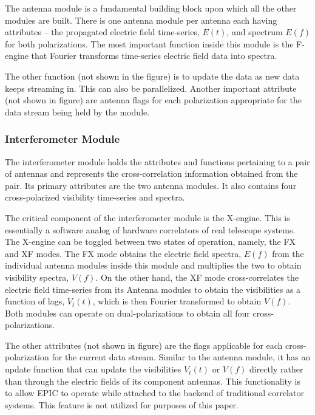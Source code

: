 \documentclass[a4paper,fleqn,usenatbib]{mnras}
\begin{document}
The antenna module is a fundamental building block upon which all the other 
modules are built. There is one antenna module per antenna each having 
attributes -- the propagated electric field time-series, $E(t)$, and spectrum 
$E(f)$ for both polarizations. The most important function inside this module 
is the F-engine that Fourier transforms time-series electric field data into 
spectra. 

The other function (not shown in the figure) is to update the data as new data 
keeps streaming in. This can also be parallelized. Another important attribute
(not shown in figure) are antenna flags for each polarization appropriate for 
the data stream being held by the module. 

\subsubsection{Interferometer Module}

The interferometer module holds the attributes and functions pertaining to
a pair of antennas and represents the cross-correlation information obtained
from the pair. Its primary attributes are the two antenna modules. It also
contains four cross-polarized visibility time-series and spectra. 

The critical component of the interferometer module is the X-engine. This is 
essentially a software analog of hardware correlators of real telescope 
systems. The X-engine can be toggled between two states of operation, 
namely, the FX and XF modes. The FX mode obtains the electric field spectra, 
$E(f)$ from the individual antenna modules inside this module and multiplies 
the two to obtain visibility spectra, $V(f)$. On the other hand, the XF mode 
cross-correlates the electric field time-series from its Antenna modules
to obtain the visibilities as a function of lags, $V_t(t)$, which is then Fourier 
transformed to obtain $V(f)$. Both modules can operate on dual-polarizations to
obtain all four cross-polarizations.

The other attributes (not shown in figure) are the flags applicable for each
cross-polarization for the current data stream. Similar to the antenna module,
it has an update function that can update the visibilities $V_t(t)$ or $V(f)$
directly rather than through the electric fields of its component antennas. 
This functionality is to allow EPIC to operate while attached to the backend 
of traditional correlator systems. This feature is not utilized for purposes 
of this paper.
\end{document}
